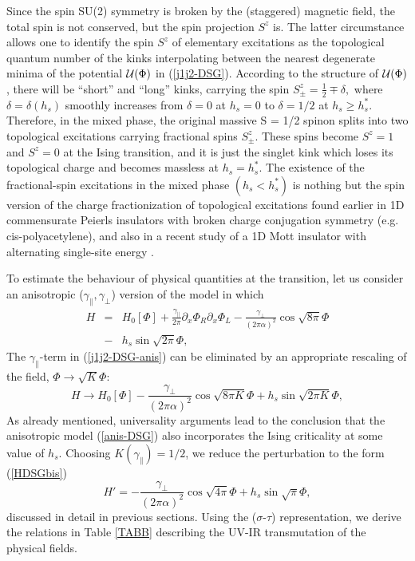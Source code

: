 Since the spin SU(2) symmetry is broken by the (staggered) magnetic field,
the total spin is not conserved, but the spin projection
$S^z$ is. The latter circumstance allows one to identify the
spin $S^z$ of elementary excitations as the topological quantum number
of the kinks interpolating between the nearest degenerate minima
of the potential ${\cal{U}}(\Phi)$ in (\ref{j1j2-DSG}).
According to the structure of ${\cal{U}}(\Phi)$, there will be ``short''
and ``long'' kinks, carrying the spin
$
S^z _{\pm} = \frac{1}{2} \mp \delta,
$
where $\delta = \delta (h_s)$ smoothly increases from
$\delta = 0$ at $h_s = 0$ to $\delta = 1/2$ at $h_s \geq h^* _s$.
Therefore, in the mixed phase,
the original massive S = 1/2 spinon splits into two
topological excitations carrying
fractional spins $S^z _{\pm}$. These spins become $S^z = 1$ and
$S^z = 0$ at the Ising transition, and it is just the singlet kink which
loses its topological charge and becomes massless at $h_s = h^* _s$.
The existence of the fractional-spin excitations in the mixed phase
$( h_s < h^* _s)$
is nothing but the spin version of the charge fractionization of
topological excitations found
earlier in 1D commensurate Peierls insulators with broken charge conjugation
symmetry (e.g. cis-polyacetylene)\cite{braz}, and also in a recent study of
a 1D Mott insulator with alternating single-site energy \cite{FGN}.

To estimate the behaviour of physical quantities at the transition, let
us consider an anisotropic ($\gamma_{\parallel}, \gamma_{\perp}$)
version of the model in which
\begin{eqnarray}
H &=& H_0 [\Phi]
+ \frac{\gamma_{\parallel}}{2\pi} \partial_x \Phi_R \partial_x \Phi_L
- \frac{\gamma_{\perp}}{(2\pi \alpha)^2} \cos \sqrt{8\pi} \Phi \nonumber\\
&-& h_s \sin \sqrt{2\pi} \Phi,
\label{j1j2-DSG-anis}
\end{eqnarray}
The $\gamma_{\parallel}$-term in (\ref{j1j2-DSG-anis}) can be eliminated
by an appropriate rescaling of the field, $\Phi \rightarrow \sqrt{K} \Phi$:
\begin{equation}
H \rightarrow H_0 [\Phi]
- \frac{\gamma_{\perp}}{(2\pi \alpha)^2} \cos \sqrt{8\pi K} \Phi
+ h_s \sin \sqrt{2\pi K} \Phi,
\label{anis-DSG}
\end{equation}
As already mentioned, universality arguments lead to the conclusion
that the anisotropic model (\ref{anis-DSG}) also
incorporates the Ising criticality at some value of $h_s$.
Choosing $K (\gamma_{\parallel}) = 1/2$, we reduce the perturbation to
the form (\ref{HDSGbis})
\begin{equation}
H' = - \frac{\gamma_{\perp}}{(2\pi \alpha)^2} \cos \sqrt{4\pi}\Phi
+ h_s \sin \sqrt{\pi} \Phi,
\label{desired-DSG}
\end{equation}
discussed in detail in previous sections. Using the ($\sigma$-$\tau$)
representation,
we derive the relations in Table \ref{TABB}
describing the UV-IR transmutation of the physical fields.

